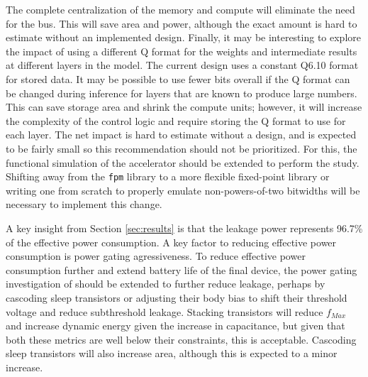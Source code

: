 The complete centralization of the memory and compute will eliminate the need for the bus. This will save area and power, although the exact amount is hard to estimate without an implemented
design. Finally, it may be interesting to explore the impact of using a different Q format for the weights and intermediate results at different layers in the model. The current design uses
a constant Q6.10 format for stored data. It may be possible to use fewer bits overall if the Q format can be changed during inference for layers that are known to produce large numbers. This
can save storage area and shrink the compute units; however, it will increase the complexity of the control logic and require storing the Q format to use for each layer. The net impact is 
hard to estimate without a design, and is expected to be fairly small so this recommendation should not be prioritized. For this, the functional simulation of the accelerator should be extended
to perform the study. Shifting away from the \texttt{fpm} library to a more flexible fixed-point library or writing one from scratch to properly emulate non-powers-of-two bitwidths will be
necessary to implement this change.

A key insight from Section \ref{sec:results} is that the leakage power represents 96.7\% of the effective power consumption. A key factor to reducing effective power consumption is power gating
agressiveness. To reduce effective power consumption further and extend battery life of the final device, the power gating investigation of \cite{sathanur2008quantifying} should be extended to
further reduce leakage, perhaps by cascoding sleep transistors or adjusting their body bias to shift their threshold voltage and reduce subthreshold leakage. Stacking transistors will reduce
$f_{Max}$ and increase dynamic energy given the increase in capacitance, but given that both these metrics are well below their constraints, this is acceptable. Cascoding sleep transistors will
also increase area, although this is expected to a minor increase.

